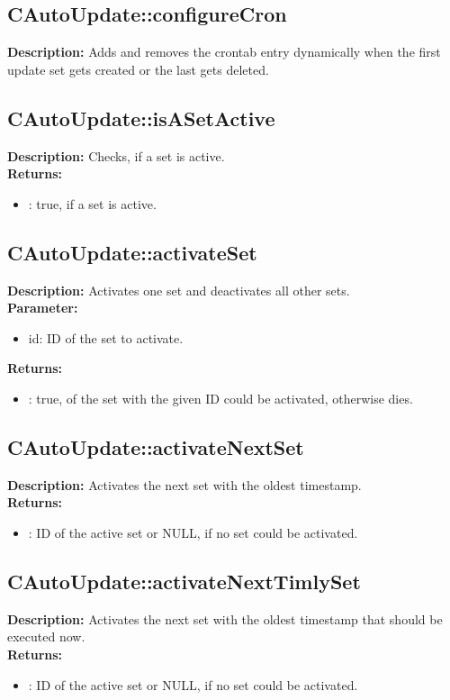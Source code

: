 \subsection{CAutoUpdate::configureCron}
\textbf{Description:} Adds and removes the crontab entry dynamically when the first update set gets created or the last gets deleted.\\

\subsection{CAutoUpdate::isASetActive}
\textbf{Description:} Checks, if a set is active.\\
\textbf{Returns:}
\begin{itemize}
\item : true, if a set is active.
\end{itemize}

\subsection{CAutoUpdate::activateSet}
\textbf{Description:} Activates one set and deactivates all other sets.\\
\textbf{Parameter:}
\begin{itemize}
\item id: ID of the set to activate.
\end{itemize}
\textbf{Returns:}
\begin{itemize}
\item : true, of the set with the given ID could be activated, otherwise dies.
\end{itemize}

\subsection{CAutoUpdate::activateNextSet}
\textbf{Description:} Activates the next set with the oldest timestamp.\\
\textbf{Returns:}
\begin{itemize}
\item : ID of the active set or NULL, if no set could be activated.
\end{itemize}

\subsection{CAutoUpdate::activateNextTimlySet}
\textbf{Description:} Activates the next set with the oldest timestamp that should be executed now.\\
\textbf{Returns:}
\begin{itemize}
\item : ID of the active set or NULL, if no set could be activated.
\end{itemize}

